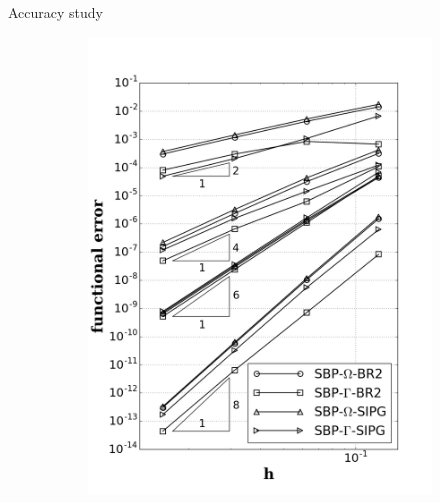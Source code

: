 \documentclass{beamer}
\begin{document}
\begin{frame}{Accuracy study}
\begin{figure}
\begin{subfigure}[b]{0.425\linewidth}
            \includegraphics[width=1.0\linewidth]{figures/j_accuracy.png}
        \end{subfigure}
    \end{figure}
\end{frame}
\end{document}
